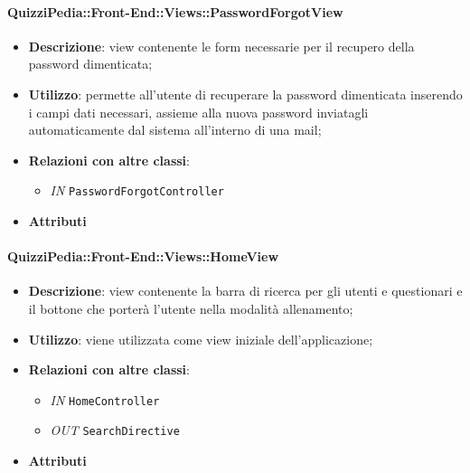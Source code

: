 \paragraph{QuizziPedia::Front-End::Views::PasswordForgotView}
\begin{itemize}
	\item \textbf{Descrizione}: view contenente le form necessarie per il recupero della password dimenticata;
	\item \textbf{Utilizzo}: permette all'utente di recuperare la password dimenticata inserendo i campi dati necessari, assieme alla nuova password inviatagli automaticamente dal sistema all'interno di una mail;
	\item \textbf{Relazioni con altre classi}:
	\begin{itemize}
		\item \textit{IN} \texttt{PasswordForgotController} \\
	\end{itemize}
	\item \textbf{Attributi}
\end{itemize}

\paragraph{QuizziPedia::Front-End::Views::HomeView}
\begin{itemize}
	\item \textbf{Descrizione}: view contenente la barra di ricerca per gli utenti e questionari e il bottone che porterà l'utente nella modalità allenamento;
	\item \textbf{Utilizzo}: viene utilizzata come view iniziale dell'applicazione;
	\item \textbf{Relazioni con altre classi}:
	\begin{itemize}
		\item \textit{IN} \texttt{HomeController} \\
		\item \textit{OUT} \texttt{SearchDirective} \\
	\end{itemize}
	\item \textbf{Attributi}
\end{itemize}
	
